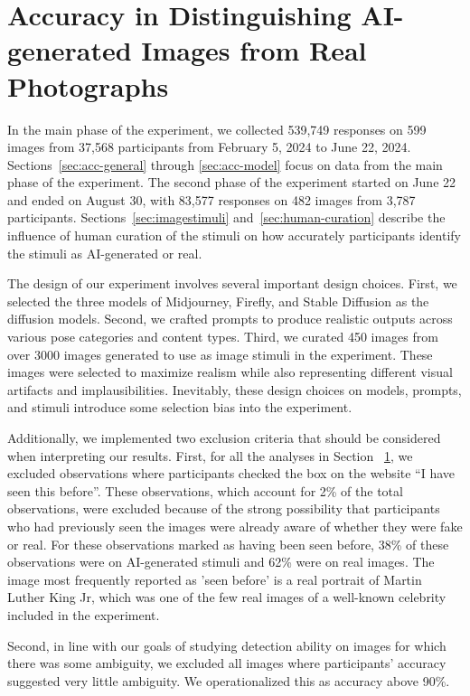 \section{Accuracy in Distinguishing AI-generated Images from Real Photographs}\label{sec:results}

In the main phase of the experiment, we collected 539,749 responses on 599 images from 37,568 participants from February 5, 2024 to June 22, 2024. Sections~\ref{sec:acc-general} through \ref{sec:acc-model} focus on data from the main phase of the experiment. The second phase of the experiment started on June 22 and ended on August 30, with 83,577 responses on 482 images from 3,787 participants. Sections~\ref{sec:imagestimuli} and~\ref{sec:human-curation} describe the influence of human curation of the stimuli on how accurately participants identify the stimuli as AI-generated or real. 

The design of our experiment involves several important design choices. First, we selected the three models
of Midjourney, Firefly, and Stable Diffusion as the diffusion models. Second, we crafted prompts to produce realistic
outputs across various pose categories and content types. Third, we curated 450 images from over 3000 images generated
to use as image stimuli in the experiment. These images were selected to maximize realism while also representing
different visual artifacts and implausibilities. Inevitably, these design choices on models, prompts, and stimuli introduce some selection bias  into the experiment.

Additionally, we implemented two exclusion criteria that should be considered when interpreting our results. First, for all the analyses in Section ~\ref{sec:results}, we excluded observations where participants checked the box on the website ``I have seen this before''. These observations, which account for 2\% of the total observations, were excluded because of the strong possibility that participants who had previously seen the images were already aware of whether they were fake or real.
For these observations marked as having been seen before, 38\% of these observations were on AI-generated stimuli and 62\% were on real images. The image most frequently reported as 'seen before' is a real portrait of Martin Luther King Jr, which was one of the few real images of a well-known celebrity included in the experiment. 

Second, in line with our goals of studying detection ability on images for which there was some ambiguity, we excluded all images where participants' accuracy suggested very little ambiguity. We operationalized this as accuracy above 90\%. 

